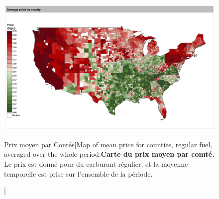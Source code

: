 \begin{figure}
\includegraphics[width=\linewidth]{Figures/Final/8-2-2-fig-energyprice-map_price}
\caption[Mean price for counties][Prix moyen par Contés]{Map of mean price for counties, regular fuel, averaged over the whole period.\label{fig:energyprice:map_price}}{\textbf{Carte du prix moyen par comté.} Le prix est donné pour du carburant régulier, et la moyenne temporelle est prise sur l'ensemble de la période.\label{fig:energyprice:map_price}}
\end{figure}


